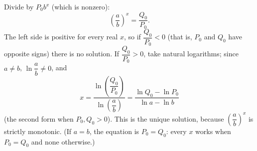 Divide by $P_0b^x$ (which is nonzero):
\[
\left(\dfrac {a}{b}\right)^x=\dfrac{Q_0}{P_0}.
\]
The left side is positive for every real $x$, so if $\dfrac{Q_0}{P_0}<0$ (that is, $P_0$ and $Q_0$ have opposite signs) there is no solution. If $\dfrac{Q_0}{P_0}>0$, take natural logarithms; since $a\ne b$, $\ln\dfrac {a}{b}\ne0$, and
\[
\boxed{x=\dfrac{\ln\left(\dfrac{Q_0}{P_0}\right)}{\ln\left(\dfrac {a}{b}\right)}=\dfrac{\ln Q_0-\ln P_0}{\ln a-\ln b}}
\]
(the second form when $P_0,Q_0>0$). This is the unique solution, because $\left(\dfrac {a}{b}\right)^x$ is strictly monotonic. (If $a=b$, the equation is $P_0=Q_0$: every $x$ works when $P_0=Q_0$ and none otherwise.)
